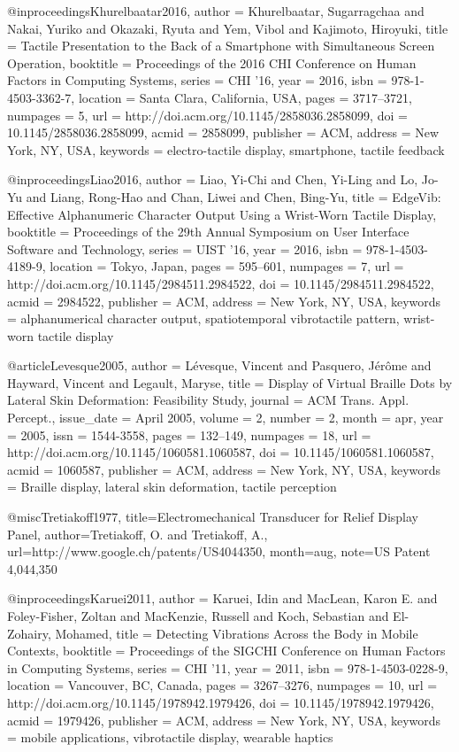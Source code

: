 @inproceedings{Khurelbaatar2016,
 author = {Khurelbaatar, Sugarragchaa and Nakai, Yuriko and Okazaki, Ryuta and Yem, Vibol and Kajimoto, Hiroyuki},
 title = {{Tactile Presentation to the Back of a Smartphone with Simultaneous Screen Operation}},
 booktitle = {Proceedings of the 2016 CHI Conference on Human Factors in Computing Systems},
 series = {CHI '16},
 year = {2016},
 isbn = {978-1-4503-3362-7},
 location = {Santa Clara, California, USA},
 pages = {3717--3721},
 numpages = {5},
 url = {http://doi.acm.org/10.1145/2858036.2858099},
 doi = {10.1145/2858036.2858099},
 acmid = {2858099},
 publisher = {ACM},
 address = {New York, NY, USA},
 keywords = {electro-tactile display, smartphone, tactile feedback}
} 

@inproceedings{Liao2016,
 author = {Liao, Yi-Chi and Chen, Yi-Ling and Lo, Jo-Yu and Liang, Rong-Hao and Chan, Liwei and Chen, Bing-Yu},
 title = {{EdgeVib: Effective Alphanumeric Character Output Using a Wrist-Worn Tactile Display}},
 booktitle = {Proceedings of the 29th Annual Symposium on User Interface Software and Technology},
 series = {UIST '16},
 year = {2016},
 isbn = {978-1-4503-4189-9},
 location = {Tokyo, Japan},
 pages = {595--601},
 numpages = {7},
 url = {http://doi.acm.org/10.1145/2984511.2984522},
 doi = {10.1145/2984511.2984522},
 acmid = {2984522},
 publisher = {ACM},
 address = {New York, NY, USA},
 keywords = {alphanumerical character output, spatiotemporal vibrotactile pattern, wrist-worn tactile display}
} 

@article{Levesque2005,
 author = {L{\'e}vesque, Vincent and Pasquero, J{\'e}r\^{o}me and Hayward, Vincent and Legault, Maryse},
 title = {{Display of Virtual Braille Dots by Lateral Skin Deformation: Feasibility Study}},
 journal = {ACM Trans. Appl. Percept.},
 issue_date = {April 2005},
 volume = {2},
 number = {2},
 month = apr,
 year = {2005},
 issn = {1544-3558},
 pages = {132--149},
 numpages = {18},
 url = {http://doi.acm.org/10.1145/1060581.1060587},
 doi = {10.1145/1060581.1060587},
 acmid = {1060587},
 publisher = {ACM},
 address = {New York, NY, USA},
 keywords = {Braille display, lateral skin deformation, tactile perception}
} 

@misc{Tretiakoff1977,
  title={{Electromechanical Transducer for Relief Display Panel}},
  author={Tretiakoff, O. and Tretiakoff, A.},
  url={http://www.google.ch/patents/US4044350},
  month=aug,
  note={US Patent 4,044,350}
}

@inproceedings{Karuei2011,
 author = {Karuei, Idin and MacLean, Karon E. and Foley-Fisher, Zoltan and MacKenzie, Russell and Koch, Sebastian and El-Zohairy, Mohamed},
 title = {{Detecting Vibrations Across the Body in Mobile Contexts}},
 booktitle = {Proceedings of the SIGCHI Conference on Human Factors in Computing Systems},
 series = {CHI '11},
 year = {2011},
 isbn = {978-1-4503-0228-9},
 location = {Vancouver, BC, Canada},
 pages = {3267--3276},
 numpages = {10},
 url = {http://doi.acm.org/10.1145/1978942.1979426},
 doi = {10.1145/1978942.1979426},
 acmid = {1979426},
 publisher = {ACM},
 address = {New York, NY, USA},
 keywords = {mobile applications, vibrotactile display, wearable haptics}
} 


